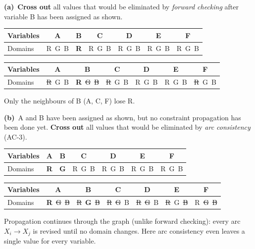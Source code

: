 \documentclass[11pt,a4paper]{article}
\newcommand{\subq}[1]{\par\smallskip\noindent\textbf{#1}\ }
\begin{document}
\subq{(a)}\textbf{Cross out} all values that would be eliminated by \emph{forward checking} after variable B has been assigned as shown.\begin{center}\small\begin{tabular}{|l|c|c|c|c|c|c|}\hline Variables & \textbf{A} & \textbf{B} & \textbf{C} & \textbf{D} & \textbf{E} & \textbf{F}\\ \hline Domains & R\ G\ B & \textbf{R} & R\ G\ B & R\ G\ B & R\ G\ B & R\ G\ B\\ \hline\end{tabular}\end{center}
\begin{solbox}
\begin{center}\small\begin{tabular}{|l|c|c|c|c|c|c|}\hline Variables & \textbf{A} & \textbf{B} & \textbf{C} & \textbf{D} & \textbf{E} & \textbf{F}\\ \hline Domains & \textcolor{red!70!black}{\sout{R}}\ G\ B & \textbf{R}\ \textcolor{red!70!black}{\sout{G}}\ \textcolor{red!70!black}{\sout{B}} & \textcolor{red!70!black}{\sout{R}}\ G\ B & R\ G\ B & R\ G\ B & \textcolor{red!70!black}{\sout{R}}\ G\ B\\ \hline\end{tabular}\end{center}Only the neighbours of B (A, C, F) lose R.
\end{solbox}
\subq{(b)}A and B have been assigned as shown, but no constraint propagation has been done yet. \textbf{Cross out} all values that would be eliminated by \emph{arc consistency} (AC-3).\begin{center}\small\begin{tabular}{|l|c|c|c|c|c|c|}\hline Variables & \textbf{A} & \textbf{B} & \textbf{C} & \textbf{D} & \textbf{E} & \textbf{F}\\ \hline Domains & \textbf{R} & \textbf{G} & R\ G\ B & R\ G\ B & R\ G\ B & R\ G\ B\\ \hline\end{tabular}\end{center}
\begin{solbox}
\begin{center}\small\begin{tabular}{|l|c|c|c|c|c|c|}\hline Variables & \textbf{A} & \textbf{B} & \textbf{C} & \textbf{D} & \textbf{E} & \textbf{F}\\ \hline Domains & \textbf{R}\ \textcolor{red!70!black}{\sout{G}}\ \textcolor{red!70!black}{\sout{B}} & \textcolor{red!70!black}{\sout{R}}\ \textbf{G}\ \textcolor{red!70!black}{\sout{B}} & \textcolor{red!70!black}{\sout{R}}\ \textcolor{red!70!black}{\sout{G}}\ B & \textcolor{red!70!black}{\sout{R}}\ \textcolor{red!70!black}{\sout{G}}\ B & \textcolor{red!70!black}{\sout{R}}\ G\ \textcolor{red!70!black}{\sout{B}} & R\ \textcolor{red!70!black}{\sout{G}}\ \textcolor{red!70!black}{\sout{B}}\\ \hline\end{tabular}\end{center}Propagation continues through the graph (unlike forward checking): every arc $X_i\to X_j$ is revised until no domain changes. Here arc consistency even leaves a single value for every variable.
\end{solbox}
\end{document}
